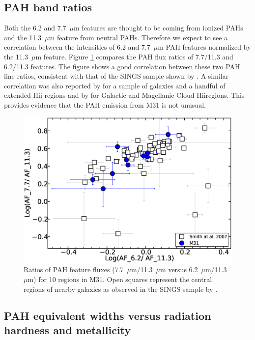 
\subsection{PAH band ratios}
\label{sect:pah_ratios}

Both the 6.2 and 7.7~$\mu$m features are thought to be coming from ionized PAHs and the 11.3~$\mu$m feature from neutral PAHs. Therefore we expect to see a correlation between the intensities of 6.2 and 7.7~$\mu$m PAH features normalized by the 11.3~$\mu$m feature.  Figure \ref{PAHlines}  compares the PAH flux ratios of 7.7/11.3  and 6.2/11.3 features. The figure shows a good correlation between these two PAH line ratios, consistent with that of the SINGS sample shown by \citet{Smith:2007lr}.
A similar correlation was also reported by  \citet{Galliano2008} for a sample of galaxies and a handful of extended H{\sc ii} regions
and by \citet{Vermeij2002} for Galactic and Magellanic Cloud H{\sc ii}regions. This provides evidence that the PAH emission from M31 is not unusual. 


\begin{figure}
\centering
\includegraphics[scale = 0.25]{./fig9.eps}
\caption{Ratios of PAH feature fluxes (7.7~$\mu$m/11.3~$\mu$m versus 6.2~$\mu$m/11.3~$\mu$m) for 10 regions in M31.
Open squares represent the central regions of nearby galaxies as observed in the SINGS sample by \citet{Smith:2007lr}.
}
\label{PAHlines}
\end{figure}


\subsection{PAH equivalent widths versus radiation hardness and metallicity}
\label{sect:eqw_rh}

